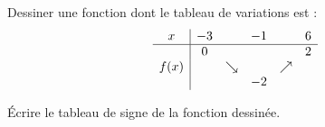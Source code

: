 
\begin{exercice}\label{exosmath-0641}

Dessiner une fonction dont le tableau de variations est :
\begin{equation*}
    \begin{array}[]{c|ccccc}
        x&-3&&-1&&6\\
        \hline
        &0&&&&2\\
        f(x)&&\searrow&&\nearrow&\\
        &&&-2&&\\
    \end{array}
\end{equation*}

Écrire le tableau de signe de la fonction dessinée.

\end{exercice}

